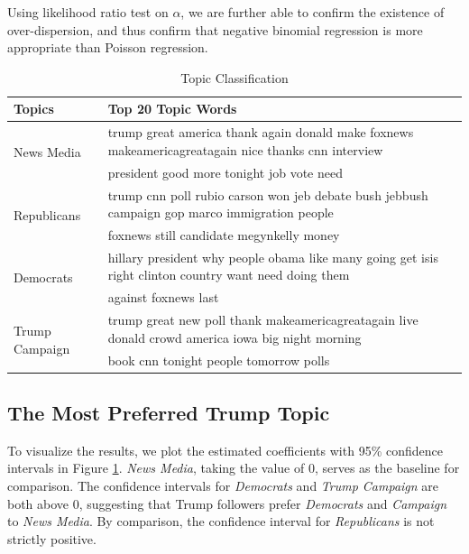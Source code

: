 \documentclass[letterpaper]{article}
\begin{document}
Using likelihood ratio test on $\alpha$, we are further able to confirm the existence of over-dispersion, and thus confirm that negative binomial regression is more appropriate than Poisson regression.

\begin{table}[]
\renewcommand{\arraystretch}{1}
\setlength{\tabcolsep}{3.5pt}
\centering
\caption{Topic Classification}
\label{topics}
\begin{tabular}{ll}
\hline\hline
Topics                        & Top 20 Topic Words                                                                            \\
\hline
\multirow{2}{*}{News Media}   & trump great america thank again donald make foxnews makeamericagreatagain                      nice thanks cnn interview\\
                              & president good more tonight job vote need \\\hline %

\multirow{2}{*}{Republicans}  & trump cnn poll rubio carson won jeb debate bush jebbush campaign gop marco immigration  people \\
                              & foxnews still candidate megynkelly money \\\hline%
\multirow{2}{*}{Democrats}    & hillary president why people obama like many going get isis right clinton country want       need doing them\\
                              & against foxnews last \\\hline %
\multirow{2}{*}{Trump Campaign} & trump great new poll thank makeamericagreatagain live donald crowd america iowa               big night morning \\
                              & book cnn tonight people tomorrow polls \\\hline\hline %

\end{tabular}
\end{table}

\subsection{The Most Preferred Trump Topic}
To visualize the results, we plot the estimated coefficients with 95\% confidence intervals in Figure \ref{topics}. \textit{News Media}, taking the value of 0, serves as the baseline for comparison. The confidence intervals for \textit{Democrats} and \textit{Trump Campaign} are both above 0, suggesting that Trump followers prefer \textit{Democrats} and  \textit{Campaign} to \textit{News Media}. By comparison, the confidence interval for \textit{Republicans} is not strictly positive.
\end{document}
